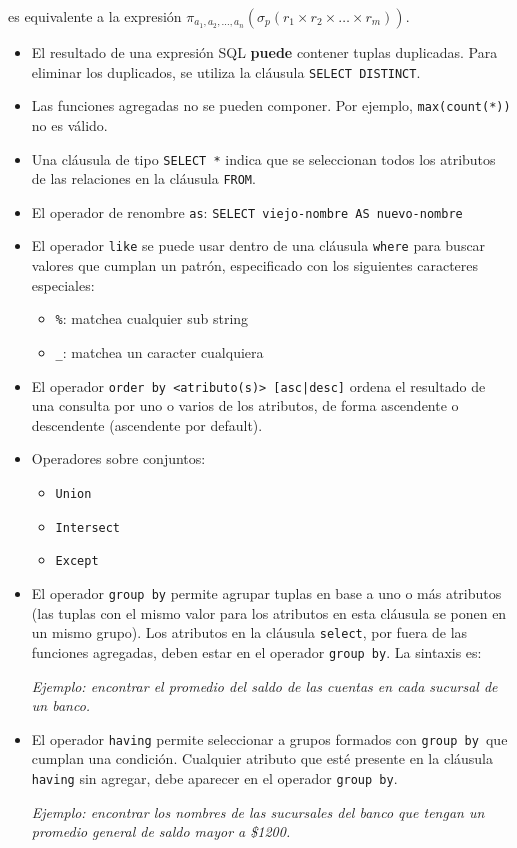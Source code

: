 \documentclass[a4paper, twoside]{article}
\newcommand{\codedir}{../resources/code} %
\begin{document}
es equivalente a la expresión $\pi_{a_{1},a_{2},\dots,a_{n}}\left(\sigma_{p}\left(r_{1}\times r_{2}\times\dots\times r_{m}\right)\right)$.
\begin{itemize}
	\item El resultado de una expresión SQL \textbf{puede} contener tuplas duplicadas. Para eliminar los duplicados, se utiliza la cláusula \texttt{SELECT DISTINCT}.
	\item Las funciones agregadas no se pueden componer. Por ejemplo, \texttt{max(count({*}))} no es válido.
	\item Una cláusula de tipo \texttt{SELECT {*}} indica que se seleccionan todos los atributos de las relaciones en la cláusula \texttt{FROM}.
	\item El operador de renombre \texttt{as}: \texttt{SELECT viejo-nombre AS nuevo-nombre}
	\item El operador \texttt{like} se puede usar dentro de una cláusula \texttt{where} para buscar valores que cumplan un patrón, especificado con los siguientes caracteres especiales: 
	\begin{itemize}
		\item \texttt{\%}: matchea cualquier sub string
		\item \texttt{\_}: matchea un caracter cualquiera
	\end{itemize}
	\item El operador \texttt{order by <atributo(s)> {[}asc|desc{]}} ordena el resultado de una consulta por uno o varios de los atributos, de forma ascendente o descendente (ascendente por default).
	\item Operadores sobre conjuntos:
	\begin{itemize}
		\item \texttt{Union}
		\item \texttt{Intersect}
		\item \texttt{Except}
	\end{itemize}
	\item El operador \texttt{group by} permite agrupar tuplas en base a uno o más atributos (las tuplas con el mismo valor para los atributos en esta cláusula se ponen en un mismo grupo). Los atributos en la cláusula \texttt{select}, por fuera de las funciones agregadas, deben estar en el operador \texttt{group by}. La sintaxis es:
	
	\emph{Ejemplo: encontrar el promedio del saldo de las cuentas en cada sucursal de un banco.}
	
	\item El operador \texttt{having} permite seleccionar a grupos formados con \texttt{group by }que cumplan una condición. Cualquier atributo que esté presente en la cláusula \texttt{having} sin agregar, debe aparecer en el operador \texttt{group by}.
	
	\emph{Ejemplo: encontrar los nombres de las sucursales del banco que tengan un promedio general de saldo mayor a \$1200.}
	
\end{itemize}
\end{document}
